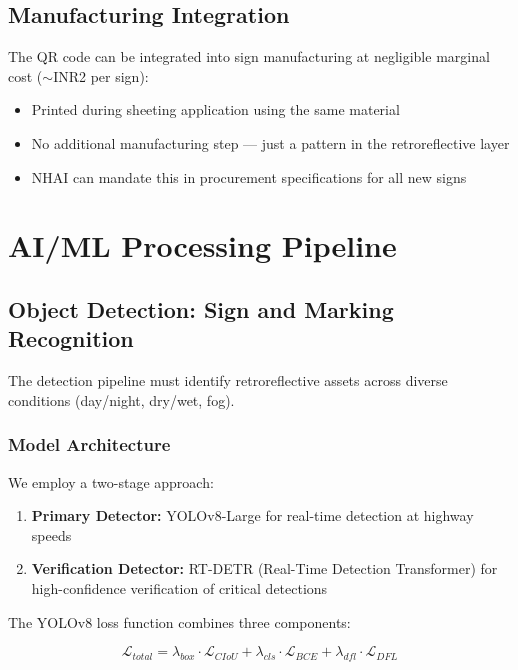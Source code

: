 \documentclass[11pt,a4paper]{article}
\newcommand{\rupmark}{\textrm{INR}}
\begin{document}
\subsection{Manufacturing Integration}

The QR code can be integrated into sign manufacturing at negligible marginal cost ($\sim$\rupmark2 per sign):
\begin{itemize}[noitemsep]
    \item Printed during sheeting application using the same material
    \item No additional manufacturing step --- just a pattern in the retroreflective layer
    \item NHAI can mandate this in procurement specifications for all new signs
\end{itemize}


\section{AI/ML Processing Pipeline}
\label{sec:ai_pipeline}

\subsection{Object Detection: Sign and Marking Recognition}

The detection pipeline must identify retroreflective assets across diverse conditions (day/night, dry/wet, fog).

\subsubsection{Model Architecture}

We employ a two-stage approach:

\begin{enumerate}[noitemsep]
    \item \textbf{Primary Detector:} YOLOv8-Large for real-time detection at highway speeds
    \item \textbf{Verification Detector:} RT-DETR (Real-Time Detection Transformer) for high-confidence verification of critical detections
\end{enumerate}

The YOLOv8 loss function combines three components:

\begin{equation}
\mathcal{L}_{total} = \lambda_{box} \cdot \mathcal{L}_{CIoU} + \lambda_{cls} \cdot \mathcal{L}_{BCE} + \lambda_{dfl} \cdot \mathcal{L}_{DFL}
\label{eq:yolo_loss}
\end{equation}
\end{document}
